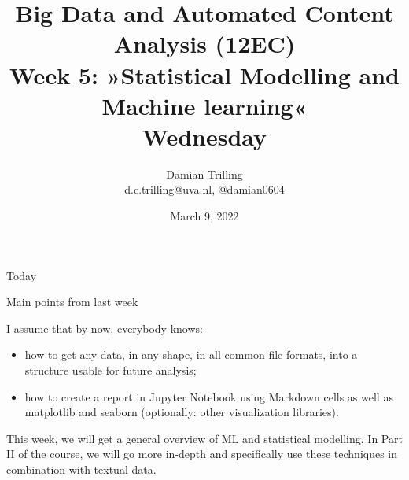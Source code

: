 

\graphicspath{{../../resources/img/}}




\title[Big Data and Automated Content Analysis]{\textbf{Big Data and Automated Content Analysis (12EC)} 
\\Week 5: »Statistical Modelling and Machine learning«
\\Wednesday}
\author[Damian Trilling]{Damian Trilling\\ \footnotesize{d.c.trilling@uva.nl, @damian0604 \\}}
\date{March 9, 2022}


\begin{frame}{}
	\titlepage
\end{frame}

\begin{frame}{Today}
	\tableofcontents
\end{frame}





\begin{frame}{Main points from last week}

\begin{alertblock}{I assume that by now, everybody knows:}
\begin{itemize}
\item how to get any data, in any shape, in all common file formats, into a structure usable for future analysis;
\item how to create a report in Jupyter Notebook using Markdown cells as well as matplotlib and seaborn (optionally: other visualization libraries).
\end{itemize}
\end{alertblock}
\end{frame}


\begin{frame}[standout]
This week, we will get a general overview of ML and statistical modelling. In Part II of the course, we will go more in-depth and specifically use these techniques in combination with textual data.
\end{frame}














